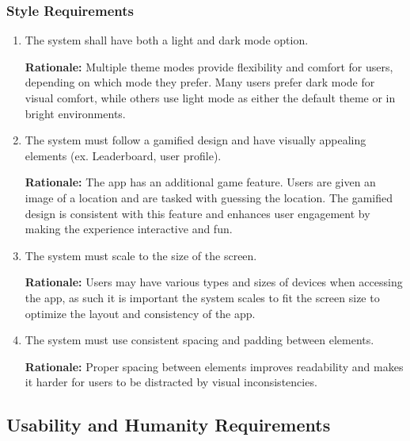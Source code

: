 \documentclass[]{article}
\begin{document}
\subsubsection{Style Requirements}
\label{ssub:style_requirements}
\begin{enumerate}[{LF-S}1. ]
	\item The system shall have both a light and dark mode option.
	
	{\bf Rationale:} Multiple theme modes provide flexibility and comfort for users, depending on which mode they prefer. Many users prefer dark mode for visual comfort, while others use light mode as either the default theme or in bright environments.
	\item The system must follow a gamified design and have visually appealing elements (ex. Leaderboard, user profile).
	
	{\bf Rationale:} The app has an additional game feature. Users are given an image of a location and are tasked with guessing the location. The gamified design is consistent with this feature and enhances user engagement by making the experience interactive and fun.
	\item The system must scale to the size of the screen.
		
	{\bf Rationale:} Users may have various types and sizes of devices when accessing the app, as such it is important the system scales to fit the screen size to optimize the layout and consistency of the app.
	\item The system must use consistent spacing and padding between elements.
	
	{\bf Rationale:} Proper spacing between elements improves readability and makes it harder for users to be distracted by visual inconsistencies.
\end{enumerate}


\subsection{Usability and Humanity Requirements}
\label{sub:usability_and_humanity_requirements}
\end{document}
